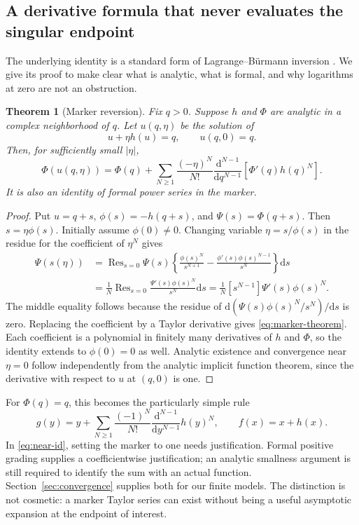 \documentclass[11pt,a4paper]{article}
\numberwithin{equation}{section}
\newtheorem{theorem}{Theorem}[section]
\theoremstyle{definition}
\theoremstyle{remark}
\newcommand{\dd}{\mathrm d}
\newcommand{\Res}{\operatorname{Res}}
\begin{document}
\subsection{A derivative formula that never evaluates the singular endpoint}

The underlying identity is a standard form of Lagrange--B\"urmann inversion
\cite{gessel}. We give its proof to make clear what is analytic, what is
formal, and why logarithms at zero are not an obstruction.

\begin{theorem}[Marker reversion]
Fix $q>0$. Suppose $h$ and $\Phi$ are analytic in a complex neighborhood of
$q$. Let $u(q,\eta)$ be the solution of
\[
 u+\eta h(u)=q,\qquad u(q,0)=q.
\]
Then, for sufficiently small $|\eta|$,
\begin{equation}
 \Phi(u(q,\eta))=\Phi(q)+
 \sum_{N\ge1}\frac{(-\eta)^N}{N!}
 \frac{\dd^{N-1}}{\dd q^{N-1}}
 \left[\Phi'(q)h(q)^N\right].
 \label{eq:marker-theorem}
\end{equation}
It is also an identity of formal power series in the marker.
\end{theorem}
\begin{proof}
Put $u=q+s$, $\phi(s)=-h(q+s)$, and $\Psi(s)=\Phi(q+s)$. Then
$s=\eta\phi(s)$. Initially assume $\phi(0)\ne0$. Changing variable
$\eta=s/\phi(s)$ in the residue for the coefficient of $\eta^N$ gives
\begin{align*}
 [\eta^N]\Psi(s(\eta))
 &=\Res_{s=0}\Psi(s)\left\{
       \frac{\phi(s)^N}{s^{N+1}}
       -\frac{\phi'(s)\phi(s)^{N-1}}{s^N}\right\}\dd s\\
 &=\frac1N\Res_{s=0}\frac{\Psi'(s)\phi(s)^N}{s^N}\dd s
 =\frac1N[s^{N-1}]\Psi'(s)\phi(s)^N.
\end{align*}
The middle equality follows because the residue of
$\dd(\Psi(s)\phi(s)^N/s^N)/\dd s$ is zero. Replacing the coefficient by a
Taylor derivative gives \eqref{eq:marker-theorem}. Each coefficient is a
polynomial in finitely many derivatives of $h$ and $\Phi$, so the identity
extends to $\phi(0)=0$ as well. Analytic existence and convergence near
$\eta=0$ follow independently from the analytic implicit function theorem,
since the derivative with respect to $u$ at $(q,0)$ is one.
\end{proof}

For $\Phi(q)=q$, this becomes the particularly simple rule
\begin{equation}
 g(y)=y+\sum_{N\ge1}\frac{(-1)^N}{N!}
 \frac{\dd^{N-1}}{\dd y^{N-1}}h(y)^N,
 \qquad f(x)=x+h(x).
 \label{eq:near-id}
\end{equation}
In \eqref{eq:near-id}, setting the marker to one needs justification.
Formal positive grading supplies a coefficientwise justification; an
analytic smallness argument is still required to identify the sum with an
actual function. Section~\ref{sec:convergence} supplies both for our finite
models. The distinction is not cosmetic: a marker Taylor series can exist
without being a useful asymptotic expansion at the endpoint of interest.
\end{document}
